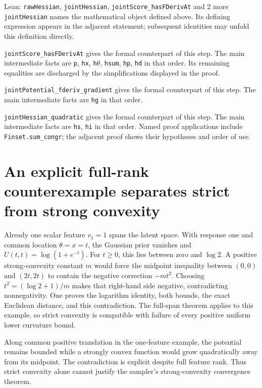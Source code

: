\documentclass[11pt,a4paper]{article}
\begin{document}
\begin{leanbox}{Lean: \texttt{rawHessian}, \texttt{jointHessian}, \texttt{jointScore\_\allowbreak{}hasFDerivAt} and 2 more}
\texttt{joint\allowbreak{}Hessian} names the mathematical object defined above. Its defining expression appears in the adjacent statement; subsequent identities may unfold this definition directly.




\texttt{joint\allowbreak{}Score\_\allowbreak{}has\allowbreak{}FDeriv\allowbreak{}At} gives the formal counterpart of this step. The main intermediate facts are \texttt{p}, \texttt{hx}, \texttt{h\ensuremath{\theta}}, \texttt{hsum}, \texttt{hp}, \texttt{hd} in that order. Its remaining equalities are discharged by the simplifications displayed in the proof.




\texttt{joint\allowbreak{}Potential\_\allowbreak{}fderiv\_\allowbreak{}gradient} gives the formal counterpart of this step. The main intermediate facts are \texttt{hg} in that order.




\texttt{joint\allowbreak{}Hessian\_\allowbreak{}quadratic} gives the formal counterpart of this step. The main intermediate facts are \texttt{hs}, \texttt{hi} in that order. Named proof applications include \texttt{Finset.\allowbreak{}sum\_\allowbreak{}congr}; the adjacent proof shows their hypotheses and order of use.
\end{leanbox}

\section{\texorpdfstring{An explicit full-rank counterexample separates strict from strong convexity}{An explicit full-rank counterexample separates strict from strong convexity}}


Already one scalar feature \(v_1=1\) spans the latent space. With response one and common location \(\theta=x=t\), the Gaussian prior vanishes and \(U(t,t)=\log(1+e^{-t})\). For \(t\ge0\), this lies between zero and \(\log2\). A positive strong-convexity constant \(m\) would force the midpoint inequality between \((0,0)\) and \((2t,2t)\) to contain the negative correction \(-mt^2\). Choosing \(t^2=(\log2+1)/m\) makes that right-hand side negative, contradicting nonnegativity. One proves the logarithm identity, both bounds, the exact Euclidean distance, and this contradiction. The full-span theorem applies to this example, so strict convexity is compatible with failure of every positive uniform lower curvature bound.



Along common positive translation in the one-feature example, the potential remains bounded while a strongly convex function would grow quadratically away from its midpoint. The contradiction is explicit despite full feature rank. Thus strict convexity alone cannot justify the sampler’s strong-convexity convergence theorem.
\end{document}
